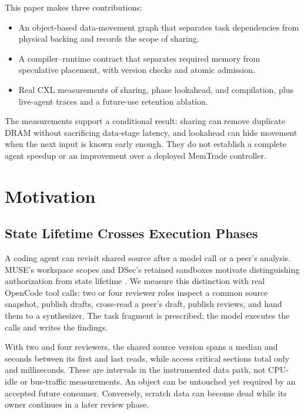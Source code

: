\documentclass[letterpaper,twocolumn,10pt]{article}
\newcommand{\memtrade}{MemTrade\xspace}
\begin{document}
This paper makes three contributions:
\begin{itemize}
  \item An object-based data-movement graph that separates task dependencies
  from physical backing and records the scope of sharing.
  \item A compiler--runtime contract that separates required memory from
  speculative placement, with version checks and atomic admission.
  \item Real CXL measurements of sharing, phase lookahead, and compilation,
  plus live-agent traces and a future-use retention ablation.
\end{itemize}

The measurements support a conditional result: sharing can remove duplicate
DRAM without sacrificing data-stage latency, and lookahead can hide movement
when the next input is known early enough. They do not establish a complete
agent speedup or an improvement over a deployed \memtrade controller.

\section{Motivation}

\subsection{State Lifetime Crosses Execution Phases}

A coding agent can revisit shared source after a model call or a peer's
analysis. MUSE's workspace scopes and DSec's retained sandboxes motivate
distinguishing authorization from state lifetime \cite{musepermissions,dsec2026}.
We measure this distinction with real OpenCode tool calls: two or four
reviewer roles inspect a common source snapshot, publish drafts, cross-read
a peer's draft, publish reviews, and hand them to a synthesizer. The task
fragment is prescribed; the model executes the calls and writes the findings.

With two and four reviewers, the shared source version spans a median
\ProfileTwoSpanSeconds{} and \ProfileFourSpanSeconds{} seconds between its
first and last reads, while access critical sections total only
\ProfileTwoActiveMillis{} and \ProfileFourActiveMillis{} milliseconds.
These are intervals in the instrumented data path, not CPU-idle or bus-traffic
measurements. An object can be untouched yet required by an accepted future
consumer. Conversely, scratch data can become dead while its owner continues
in a later review phase.
\end{document}
